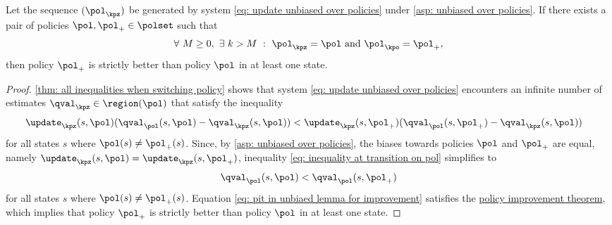\begin{lemma}
\label{thm: policy improvement if visit infinitely often}
Let the sequence $(\pol_\kpz)$ be generated by system \eqref{eq: update unbiased over policies} under \autoref{asp: unbiased over policies}.
If there exists a pair of policies $\pol, \pol_+ \in \polset$ such that
\begin{align}
    \forall \ M \geq 0, \
    \exists \ k > M \
    : \
    \pol_\kpz = \pol 
    \text{ and } 
    \pol_\kpo = \pol_+ ,
\end{align}
then policy $\pol_+$ is strictly better than policy $\pol$ in at least one state.
\end{lemma}
% 
\begin{proof}
\autoref{thm: all inequalities when switching policy}
shows that system \eqref{eq: update unbiased over policies} encounters an infinite number of estimates $\qval_\kpz \in \region(\pol)$ that satisfy the inequality
\begin{align}
\label{eq: inequality at transition on pol}
    \update_\kpz(s, \pol) ( \qval_\pol(s, \pol) - \qval_{\kpz}(s, \pol) )
    &< 
    \update_\kpz(s, \pol_+) ( \qval_\pol(s, \pol_+) - \qval_{\kpz}(s, \pol) )
\end{align}
for all states $s$ where $\pol(s) \neq \pol_+(s)$.
Since, by \autoref{asp: unbiased over policies}, the biases towards policies $\pol$ and $\pol_+$ are equal, namely $\update_\kpz(s, \pol) = \update_\kpz(s, \pol_+)$, inequality \eqref{eq: inequality at transition on pol} simplifies to
\begin{align}
\label{eq: pit in unbiaed lemma for improvement}
    \qval_\pol(s, \pol) < \qval_\pol(s, \pol_+)
\end{align}
for all states $s$ where $\pol(s) \neq \pol_+(s)$.
Equation \eqref{eq: pit in unbiaed lemma for improvement} satisfies the \hyperref[thm: policy improvement theorem]{policy improvement theorem}, which implies that policy $\pol_+$ is strictly better than policy $\pol$ in at least one state.




\end{proof}
